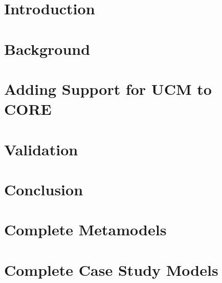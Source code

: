 \documentclass[12pt,letterpaper]{report}
\begin{document}
\renewcommand{\contentsname}{Table of Contents}
\tableofcontents
\listoffigures
\listoftables

\clearpage
{}

\chapter{Introduction}


\chapter{Background} \label{ch:2}


\chapter{Adding Support for UCM to CORE} \label{ch:3}


\chapter{Validation} \label{ch:4}


\chapter{Conclusion} \label{ch:5}


\begin{appendices}

\chapter{Complete Metamodels}


\chapter{Complete Case Study Models}


\end{appendices}

\renewcommand\bibname{References}
\printbibliography[heading=bibintoc]
\end{document}
